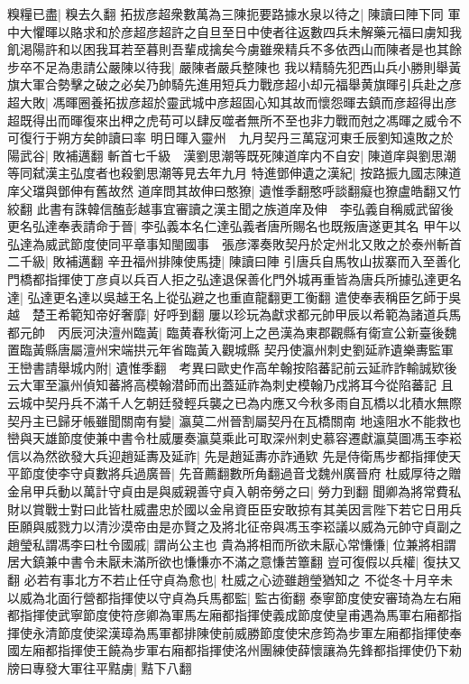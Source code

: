 糗糧已盡|{
	糗去久翻}
拓拔彦超衆數萬為三陳扼要路據水泉以待之|{
	陳讀曰陣下同}
軍中大懼暉以賂求和於彦超彦超許之自旦至日中使者往返數四兵未解藥元福曰虜知我飢渇陽許和以困我耳若至暮則吾輩成擒矣今虜雖衆精兵不多依西山而陳者是也其餘步卒不足為患請公嚴陳以待我|{
	嚴陳者嚴兵整陳也}
我以精騎先犯西山兵小勝則舉黃旗大軍合勢擊之破之必矣乃帥騎先進用短兵力戰彦超小却元福舉黄旗暉引兵赴之彦超大敗|{
	馮暉圈養拓拔彦超於靈武城中彦超固心知其故而懷怨暉去鎮而彦超得出彦超既得出而暉復來出柙之虎苟可以肆反噬者無所不至也非力戰而尅之馮暉之威令不可復行于朔方矣帥讀曰率}
明日暉入靈州　九月契丹三萬寇河東壬辰劉知遠敗之於陽武谷|{
	敗補邁翻}
斬首七千級　漢劉思潮等既死陳道庠内不自安|{
	陳道庠與劉思潮等同弑漢主弘度者也殺劉思潮等見去年九月}
特進鄧伸遺之漢紀|{
	按路振九國志陳道庠父璫與鄧伸有舊故然}
道庠問其故伸曰憨獠|{
	遺惟季翻憨呼談翻癡也獠盧皓翻又竹絞翻}
此書有誅韓信醢彭越事宜審讀之漢主聞之族道庠及伸　李弘義自稱威武留後更名弘達奉表請命于晉|{
	李弘義本名仁達弘義者唐所賜名也既叛唐遂更其名}
甲午以弘達為威武節度使同平章事知閩國事　張彦澤奏敗契丹於定州北又敗之於泰州斬首二千級|{
	敗補邁翻}
辛丑福州排陳使馬捷|{
	陳讀曰陣}
引唐兵自馬牧山拔寨而入至善化門橋都指揮使丁彦貞以兵百人拒之弘達退保善化門外城再重皆為唐兵所據弘達更名達|{
	弘達更名達以吳越王名上從弘避之也重直龍翻更工衡翻}
遣使奉表稱臣乞師于吳越　楚王希範知帝好奢靡|{
	好呼到翻}
屢以珍玩為獻求都元帥甲辰以希範為諸道兵馬都元帥　丙辰河決澶州臨黃|{
	臨黄春秋衛河上之邑漢為東郡觀縣有衛宣公新臺後魏置臨黃縣唐屬澶州宋端拱元年省臨黃入觀城縣}
契丹使瀛州刺史劉延祚遺樂夀監軍王巒書請舉城内附|{
	遺惟季翻　考異曰歐史作高牟翰按陷蕃記前云延祚詐輸誠欵後云大軍至瀛州偵知蕃將高模翰潜師而出蓋延祚為刺史模翰乃戍將耳今從陷蕃記}
且云城中契丹兵不滿千人乞朝廷發輕兵襲之已為内應又今秋多雨自瓦橋以北積水無際契丹主已歸牙帳雖聞關南有變|{
	瀛莫二州晉割屬契丹在瓦橋關南}
地遠阻水不能救也巒與天雄節度使兼中書令杜威屢奏瀛莫乘此可取深州刺史慕容遷獻瀛莫圖馮玉李崧信以為然欲發大兵迎趙延夀及延祚|{
	先是趙延夀亦詐通欵}
先是侍衛馬步都指揮使天平節度使李守貞數將兵過廣晉|{
	先音薦翻數所角翻過音戈魏州廣晉府}
杜威厚待之贈金帛甲兵動以萬計守貞由是與威親善守貞入朝帝勞之曰|{
	勞力到翻}
聞卿為將常費私財以賞戰士對曰此皆杜威盡忠於國以金帛資臣臣安敢掠有其美因言陛下若它日用兵臣願與威戮力以清沙漠帝由是亦賢之及將北征帝與馮玉李崧議以威為元帥守貞副之趙瑩私謂馮李曰杜令國戚|{
	謂尚公主也}
貴為將相而所欲未厭心常慊慊|{
	位兼將相謂居大鎮兼中書令未厭未滿所欲也慊慊亦不滿之意慊苦簟翻}
豈可復假以兵權|{
	復扶又翻}
必若有事北方不若止任守貞為愈也|{
	杜威之心迹雖趙瑩猶知之}
不從冬十月辛未以威為北面行營都指揮使以守貞為兵馬都監|{
	監古銜翻}
泰寧節度使安審琦為左右廂都指揮使武寧節度使符彦卿為軍馬左廂都指揮使義成節度使皇甫遇為馬軍右廂都指揮使永清節度使梁漢璋為馬軍都排陳使前威勝節度使宋彦筠為步軍左廂都指揮使奉國左廂都指揮使王饒為步軍右廂都指揮使洺州團練使薛懷讓為先鋒都指揮使仍下勑牓曰專發大軍往平黠虜|{
	黠下八翻}
